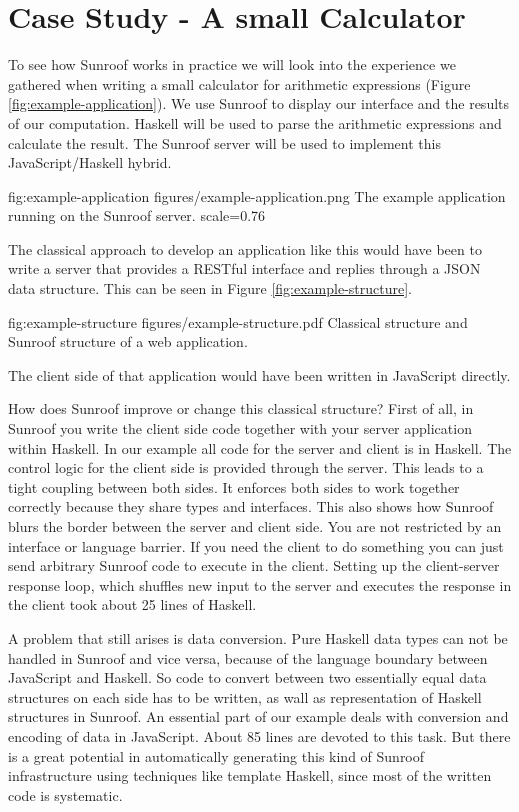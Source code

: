  
\section{Case Study - A small Calculator}
\label{sec:extended-example}

To see how Sunroof works in practice we will look into the 
experience we gathered when writing a small calculator
for arithmetic expressions (Figure \ref{fig:example-application}). 
We use Sunroof to display our interface
and the results of our computation. Haskell will be used to parse the 
arithmetic expressions and calculate the result. The Sunroof server 
will be used to implement this JavaScript/Haskell hybrid.

\FigureS%
{fig:example-application}%
{figures/example-application.png}%
{The example application running on the Sunroof server.}%
{scale=0.76}

The classical approach to develop an application like this would have 
been to write a server that provides a RESTful interface and replies 
through a JSON data structure. This can be seen in Figure 
\ref{fig:example-structure}.

\Figure%
{fig:example-structure}%
{figures/example-structure.pdf}%
{Classical structure and Sunroof structure of a web application.}

The client side of that application would have been written in JavaScript
directly.

How does Sunroof improve or change this classical structure?
First of all, in Sunroof you write the client side code together with
your server application within Haskell. In our example all code 
for the server and client is in Haskell. The control logic 
for the client side is provided through the server.
This leads to a tight coupling between both sides. 
It enforces both sides to work together
correctly because they share types and interfaces. 
This also shows how Sunroof blurs the border between the server 
and client side. You are not restricted by an interface or language 
barrier. If you need the client to do something you can just 
send arbitrary Sunroof code to execute in the client.
Setting up the client-server response loop, which shuffles 
new input to the server and executes the response in the client
took about 25 lines of Haskell.

A problem that still arises is data conversion. Pure Haskell data types
can not be handled in Sunroof and vice versa, because of the language
boundary between JavaScript and Haskell. So code to convert between two 
essentially equal data structures on each side has to be written,
as wall as representation of Haskell structures in Sunroof. An
essential part of our example deals with conversion and encoding of
data in JavaScript. About 85 lines are devoted to this task.
But there is a great potential in automatically generating this
kind of Sunroof infrastructure using techniques like template Haskell,
since most of the written code is systematic.

